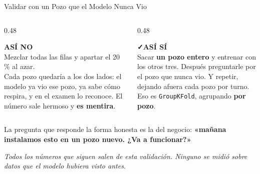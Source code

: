\documentclass[aspectratio=169, 11pt]{beamer}
\begin{document}
\begin{frame}[shrink=8]{Validar con un Pozo que el Modelo Nunca Vio}
  \vspace{-4pt}
  \begin{columns}[T]
    \begin{column}{0.48\textwidth}
      \begin{tcolorbox}[colback=arcaGray, colframe=arcaRed, boxrule=0pt, leftrule=3pt,
        arc=3pt, left=6pt, right=6pt, top=5pt, bottom=5pt]
        {\scriptsize\color{arcaRed}\bfseries\faBan\hspace{4pt}ASÍ NO}\\[4pt]
        {\scriptsize\color{textMuted}
         Mezclar todas las filas y apartar el 20\,\% al azar.\\[4pt]
         Cada pozo quedaría a los dos lados: el modelo ya vio ese pozo, ya
         sabe cómo respira, y en el examen lo reconoce. El número sale
         hermoso y \textbf{es mentira}.}
      \end{tcolorbox}
    \end{column}
    \begin{column}{0.48\textwidth}
      \begin{tcolorbox}[colback=arcaGray, colframe=codeGreen, boxrule=0pt, leftrule=3pt,
        arc=3pt, left=6pt, right=6pt, top=5pt, bottom=5pt]
        {\scriptsize\color{codeGreen}\bfseries\faCheck\hspace{4pt}ASÍ SÍ}\\[4pt]
        {\scriptsize\color{textMuted}
         Sacar \textbf{un pozo entero} y entrenar con los otros tres.
         Después preguntarle por el pozo que nunca vio. Y repetir, dejando
         afuera cada pozo por turno.\\[4pt]
         Eso es \texttt{GroupKFold}, agrupando \textbf{por pozo}.}
      \end{tcolorbox}
    \end{column}
  \end{columns}
  \vspace{8pt}
  {\footnotesize\color{arcaDark}
   La pregunta que responde la forma honesta es la del negocio:
   \textbf{«mañana instalamos esto en un pozo nuevo. ¿Va a funcionar?»}}
  \vspace{6pt}

  {\scriptsize\color{textMuted}\itshape
   Todos los números que siguen salen de esta validación. Ninguno se midió
   sobre datos que el modelo hubiera visto antes.}
\end{frame}
\end{document}
